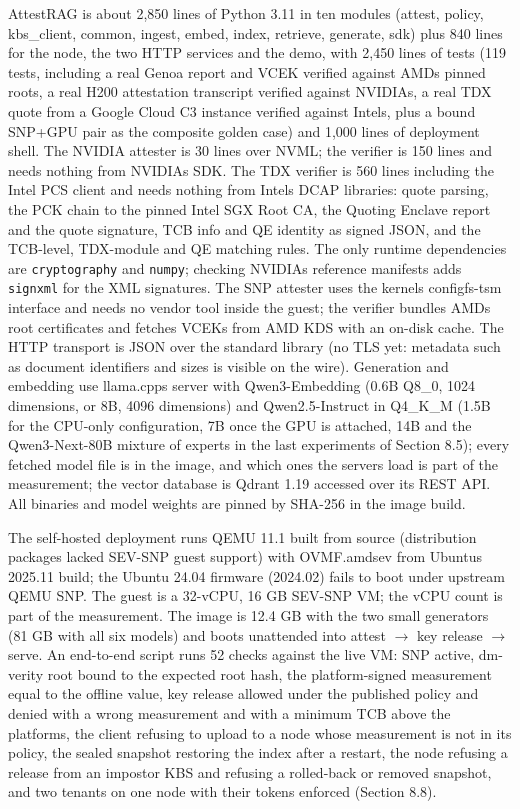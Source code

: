 \documentclass[letterpaper,twocolumn,10pt]{article}
\begin{document}
AttestRAG is about 2,850 lines of Python 3.11 in ten modules (attest, policy, kbs\_client, common, ingest, embed, index, retrieve, generate, sdk) plus 840 lines for the node, the two HTTP services and the demo, with 2,450 lines of tests (119 tests, including a real Genoa report and VCEK verified against AMD\textquotesingle s pinned roots, a real H200 attestation transcript verified against NVIDIA\textquotesingle s, a real TDX quote from a Google Cloud C3 instance verified against Intel\textquotesingle s, plus a bound SNP+GPU pair as the composite golden case) and 1,000 lines of deployment shell. The NVIDIA attester is 30 lines over NVML; the verifier is 150 lines and needs nothing from NVIDIA\textquotesingle s SDK. The TDX verifier is 560 lines including the Intel PCS client and needs nothing from Intel\textquotesingle s DCAP libraries: quote parsing, the PCK chain to the pinned Intel SGX Root CA, the Quoting Enclave report and the quote signature, TCB info and QE identity as signed JSON, and the TCB-level, TDX-module and QE matching rules. The only runtime dependencies are \texttt{cryptography} and \texttt{numpy}; checking NVIDIA\textquotesingle s reference manifests adds \texttt{signxml} for the XML signatures. The SNP attester uses the kernel\textquotesingle s configfs-tsm interface and needs no vendor tool inside the guest; the verifier bundles AMD\textquotesingle s root certificates and fetches VCEKs from AMD KDS with an on-disk cache. The HTTP transport is JSON over the standard library (no TLS yet: metadata such as document identifiers and sizes is visible on the wire). Generation and embedding use llama.cpp\textquotesingle s server \cite{llamacpp} with Qwen3-Embedding (0.6B Q8\_0, 1024 dimensions, or 8B, 4096 dimensions) and Qwen2.5-Instruct in Q4\_K\_M (1.5B for the CPU-only configuration, 7B once the GPU is attached, 14B and the Qwen3-Next-80B mixture of experts in the last experiments of Section 8.5); every fetched model file is in the image, and which ones the servers load is part of the measurement; the vector database is Qdrant 1.19 \cite{qdrant} accessed over its REST API. All binaries and model weights are pinned by SHA-256 in the image build.

The self-hosted deployment runs QEMU 11.1 built from source (distribution packages lacked SEV-SNP guest support) with OVMF.amdsev from Ubuntu\textquotesingle s 2025.11 build; the Ubuntu 24.04 firmware (2024.02) fails to boot under upstream QEMU SNP. The guest is a 32-vCPU, 16 GB SEV-SNP VM; the vCPU count is part of the measurement. The image is 12.4 GB with the two small generators (81 GB with all six models) and boots unattended into attest $\rightarrow$ key release $\rightarrow$ serve. An end-to-end script runs 52 checks against the live VM: SNP active, dm-verity root bound to the expected root hash, the platform-signed measurement equal to the offline value, key release allowed under the published policy and denied with a wrong measurement and with a minimum TCB above the platform\textquotesingle s, the client refusing to upload to a node whose measurement is not in its policy, the sealed snapshot restoring the index after a restart, the node refusing a release from an impostor KBS and refusing a rolled-back or removed snapshot, and two tenants on one node with their tokens enforced (Section 8.8).
\end{document}
